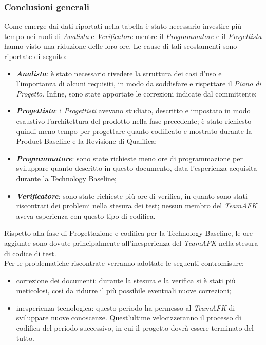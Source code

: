 \subsubsection{Conclusioni generali}
Come emerge dai dati riportati nella tabella è stato necessario investire più tempo nei ruoli di \textit{Analista} e \textit{Verificatore} mentre il \textit{Programmatore} e il \textit{Progettista} hanno visto una riduzione delle loro ore. Le cause di tali scostamenti sono riportate di seguito:
\begin{itemize}
	\item \textbf{\textit{Analista}}: è stato necessario rivedere la struttura dei casi d'uso e l'importanza di alcuni requisiti, in modo da soddisfare e rispettare il \textit{Piano di Progetto}. Infine, sono state apportate le correzioni indicate dal committente;
	\item \textbf{\textit{Progettista}}: i \textit{Progettisti} avevano studiato, descritto e impostato in modo esaustivo l'architettura del prodotto nella fase precedente; è stato richiesto quindi meno tempo per progettare quanto codificato e mostrato durante la Product Baseline e la Revisione di Qualifica; 
	\item \textbf{\textit{Programmatore}}: sono state richieste meno ore di programmazione per sviluppare quanto descritto in questo documento, data l'esperienza acquisita durante la Technology Baseline;
	\item \textbf{\textit{Verificatore}}: sono state richieste più ore di verifica, in quanto sono stati riscontrati dei problemi nella stesura dei test; nessun membro del \textit{TeamAFK} aveva esperienza con questo tipo di codifica.
\end{itemize}
Rispetto alla fase di Progettazione e codifica per la Technology Baseline, le ore aggiunte sono dovute principalmente all'inesperienza del \textit{TeamAFK} nella stesura di codice di test. \\
Per le problematiche riscontrate verranno adottate le seguenti contromisure: 
\begin{itemize}
	\item correzione dei documenti: durante la stesura e la verifica si è stati più meticolosi, così da ridurre il più possibile eventuali nuove correzioni;
	\item inesperienza tecnologica: questo periodo ha permesso al \textit{TeamAFK} di sviluppare nuove conoscenze. Quest'ultime velocizzeranno il processo di codifica del periodo successivo, in cui il progetto dovrà essere terminato del tutto.
\end{itemize}


